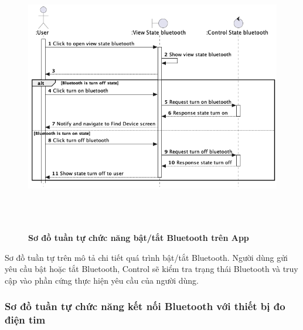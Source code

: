   \begin{figure}[H]
        \centering
        \includegraphics[width=16cm,height=12cm]{Images/mobile_app/turn_on_off_bluetooth.png}
        \caption[Sơ đồ tuần tự chức năng bật/tắt Bluetooth trên App]{\bfseries \fontsize{12pt}{0pt}
        \selectfont Sơ đồ tuần tự chức năng bật/tắt Bluetooth trên App}
        \label{turn_on_off_bluetooth} %
  \end{figure}

  Sơ đồ tuần tự trên mô tả chi tiết quá trình bật/tắt Bluetooth. Người dùng gửi yêu cầu bật hoặc tắt Bluetooth, Control sẽ kiểm tra
  trạng thái Bluetooth và truy cập vào phần cứng thực hiện yêu cầu của người dùng.

\subsubsection{Sơ đồ tuần tự chức năng kết nối Bluetooth với thiết bị đo điện tim}

